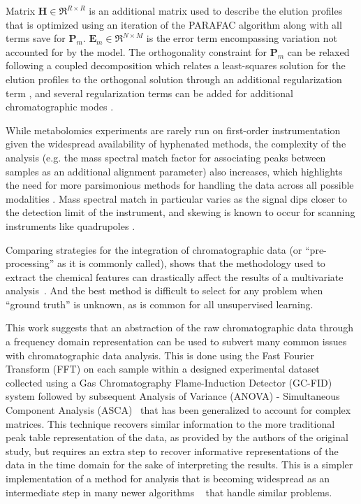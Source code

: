 \documentclass[preprint,12pt]{elsarticle}
\begin{document}
Matrix $\mathbf{H} \in \Re^{R\times R}$ is an additional matrix used to describe the elution profiles that is optimized using an iteration of the PARAFAC algorithm along with all terms save for $\mathbf{P}_m$. $\mathbf{E}_m \in \Re^{N \times M}$ is the error term encompassing variation not accounted for by the model. The orthogonality constraint for $\mathbf{P}_m$ can be relaxed following a coupled decomposition which relates a least-squares solution for the elution profiles to the orthogonal solution through an additional regularization term \cite{cohen2018nonnegative}, and several regularization terms can be added for additional chromatographic modes \cite{armstrong2023parafac2}.

While metabolomics experiments are rarely run on first-order instrumentation given the widespread availability of hyphenated methods, the complexity of the analysis (e.g. the mass spectral match factor for associating peaks between samples as an additional alignment parameter) also increases, which highlights the need for more parsimonious methods for handling the data across all possible modalities \cite{smith1995handbook}. Mass spectral match in particular varies as the signal dips closer to the detection limit of the instrument, and skewing is known to occur for scanning instruments like quadrupoles \cite{samokhin2018spectral}.

Comparing strategies for the integration of chromatographic data (or ``pre-processing'' as it is commonly called), shows that the methodology used to extract the chemical features can drastically affect the results of a multivariate analysis~\cite{weggler2021unique}. And the best method is difficult to select for any problem when ``ground truth'' is unknown, as is common for all unsupervised learning.

This work suggests that an abstraction of the raw chromatographic data through a frequency domain representation can be used to subvert many common issues with chromatographic data analysis. This is done using the Fast Fourier Transform (FFT) on each sample within a designed experimental dataset collected using a Gas Chromatography Flame-Induction Detector (GC-FID) system followed by subsequent Analysis of Variance (ANOVA) - Simultaneous Component Analysis (ASCA)~\cite{smilde2005anova} that has been generalized to account for complex matrices. This technique recovers similar information to the more traditional peak table representation of the data, as provided by the authors of the original study, but requires an extra step to recover informative representations of the data in the time domain for the sake of interpreting the results. This is a simpler implementation of a method for analysis that is becoming widespread as an intermediate step in many newer algorithms ~\cite{schneide2023shift,schneide2024shift,yu2023parasias} that handle similar problems.
\end{document}
